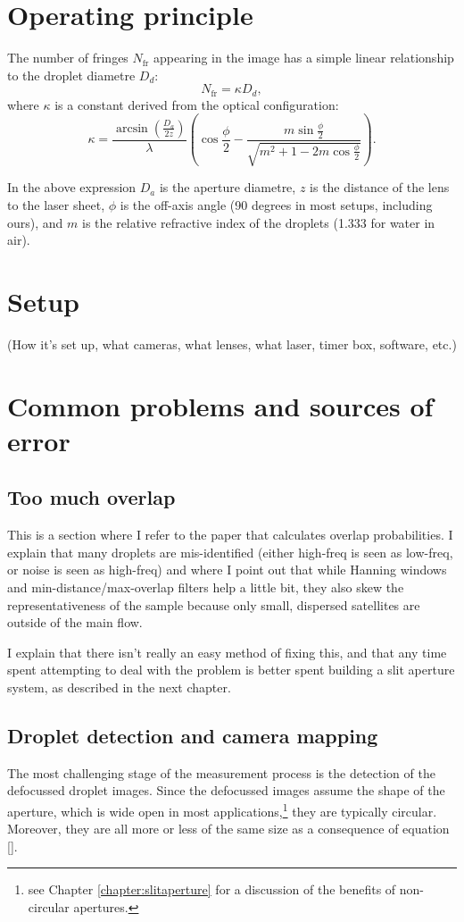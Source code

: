 \documentclass[10pt]{book}
\begin{document}
\section{Operating principle}
The number of fringes $N_\text{fr}$ appearing in the image has a simple linear relationship to
the droplet diametre $D_d$:
\begin{equation}
    N_\text{fr} = \kappa D_d,
\end{equation}
where $\kappa$ is a constant derived from the optical configuration:
\begin{equation}
    \kappa = \frac{\arcsin\left(\frac{D_a}{2z}\right)}{\lambda}
    \left(\cos\frac{\phi}{2} - \frac{m \sin\frac{\phi}{2}}{\sqrt{m^2 + 1 -
    2m\cos \frac{\phi}{2}}}\right).
    \label{kappa}
\end{equation}

In the above expression $D_a$ is the aperture diametre, $z$ is the distance of
the lens to the laser sheet, $\phi$ is the off-axis angle (90 degrees in most
setups, including ours), and $m$ is the relative refractive index of the
droplets (1.333 for water in air).

\section{Setup}
(How it's set up, what cameras, what lenses, what laser, timer box, software,
etc.)

\section{Common problems and sources of error}
\subsection{Too much overlap}
This is a section where I refer to the paper that calculates overlap
probabilities. I explain that many droplets are mis-identified (either high-freq
is seen as low-freq, or noise is seen as high-freq) and where I point out that
while Hanning windows and min-distance/max-overlap filters help a little bit,
they also skew the representativeness of the sample because only small,
dispersed satellites are outside of the main flow.

I explain that there isn't really an easy method of fixing this, and that any
time spent attempting to deal with the problem is better spent building a slit
aperture system, as described in the next chapter.

\subsection{Droplet detection and camera mapping}
The most challenging stage of the measurement process is the detection of the
defocussed droplet images. Since the defocussed images assume the shape of the
aperture, which is wide open in most applications,\footnote{see Chapter
\ref{chapter:slitaperture} for a discussion of the benefits of non-circular
apertures.} they are typically circular. Moreover, they are all more or less of
the same size as a consequence of equation \eqref{}.
\end{document}
